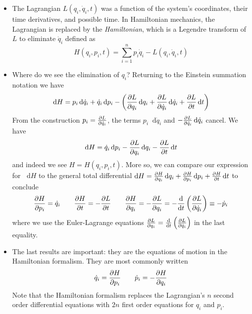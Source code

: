 \documentclass[11pt, a4paper]{article}
\newcommand{\diff}{\mathop{}\!\mathrm{d}} %
\begin{document}
\begin{itemize}
	\item The Lagrangian $ L(q_{i}, \dot{q}_{i}, t) $ was a function of the system's coordinates, their time derivatives, and possible time. In Hamiltonian mechanics, the Lagrangian is replaced by the \textit{Hamiltonian}, which is a Legendre transform of $ L $ to eliminate $ \dot{q}_{i} $ defined as
	\begin{equation*}
		H(q_{i}, p_{i}, t) = \sum_{i=1}^{n} p_{i}\dot{q}_{i} - L(q_{i}, \dot{q}_{i}, t) 
	\end{equation*}
	
	\item Where do we see the elimination of $ q_{i} $? Returning to the Einstein summation notation we have
	\begin{equation*}
		\diff H = p_{i} \diff \dot{q}_{i} + \dot{q}_{i} \diff p_{i} - \left(\pdv{L}{q_{i}}\diff q_{i} + \pdv{L}{\dot{q}_{i}}\diff \dot{q}_{i} + \pdv{L}{t}\diff t\right)
	\end{equation*}
	From the construction $ p_{i} = \pdv{L}{\dot{q}_{i}} $, the terms $ p_{i} \diff \dot{q}_{i} $ and $ - \pdv{L}{\dot{q}_{i}}\diff \dot{q}_{i} $ cancel. We have
	\begin{equation*}
		\diff H = \dot{q}_{i} \diff p_{i} - \pdv{L}{q_{i}}\diff q_{i} - \pdv{L}{t}\diff t
	\end{equation*}
	and indeed we see $ H = H(q_{i}, p_{i}, t) $. More so, we can compare our expression for $ \diff H $ to the general total differential $ \diff H = \pdv{H}{q_{i}} \diff q_{i} + \pdv{H}{p_{i}} \diff p_{i} + \pdv{H}{t} \diff t$ to conclude
	\begin{equation*}
		\pdv{H}{p_{i}} = \dot{q}_{i} \qquad \pdv{H}{t} = -\pdv{L}{t} \qquad \pdv{H}{q_{i}} = - \pdv{L}{q_{i}} = - \dv{}{t}\left(\pdv{L}{\dot{q}_{i}}\right) \equiv - \dot{p}_{i}
	\end{equation*}
	where we use the Euler-Lagrange equations $ \pdv{L}{q_{i}} = \dv{}{t}\left(\pdv{L}{\dot{q}_{i}}\right) $ in the last equality.
	
	\item The last results are important: they are the equations of motion in the Hamiltonian formalism. They are most commonly written
	\begin{equation*}
		 \dot{q}_{i} = \pdv{H}{p_{i}} \qquad \dot{p}_{i} = - \pdv{H}{q_{i}} 
	\end{equation*}
	Note that the Hamiltonian formalism replaces the Lagrangian's $ n $ second order differential equations with $ 2n $ first order equations for $ q_{i} $ and $ p_{i} $.
\end{itemize}
\end{document}
